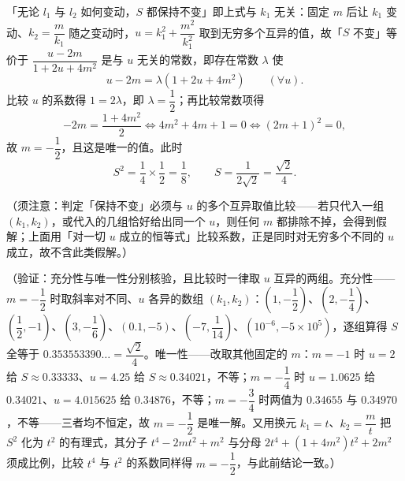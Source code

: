 \begin{answer}
「无论 \(l_{1}\) 与 \(l_{2}\) 如何变动，\(S\) 都保持不变」即上式与 \(k_{1}\) 无关：固定 \(m\) 后让 \(k_{1}\) 变动、\(k_{2}=\dfrac{m}{k_{1}}\) 随之变动时，\(u=k_{1}^{2}+\dfrac{m^{2}}{k_{1}^{2}}\) 取到无穷多个互异的值，故「\(S\) 不变」等价于 \(\dfrac{u-2m}{1+2u+4m^{2}}\) 是与 \(u\) 无关的常数，即存在常数 \(\lambda\) 使
\nopagebreak[4]
\[
u-2m=\lambda\left(1+2u+4m^{2}\right)\qquad(\forall u).
\]
比较 \(u\) 的系数得 \(1=2\lambda\)，即 \(\lambda=\dfrac{1}{2}\)；再比较常数项得
\nopagebreak[4]
\[
-2m=\frac{1+4m^{2}}{2}\iff4m^{2}+4m+1=0\iff(2m+1)^{2}=0,
\]
故 \(m=-\dfrac{1}{2}\)，且这是唯一的值。此时
\nopagebreak[4]
\[
S^{2}=\frac{1}{4}\times\frac{1}{2}=\frac{1}{8},\qquad S=\frac{1}{2\sqrt2}=\frac{\sqrt2}{4}.
\]

（须注意：判定「保持不变」必须与 \(u\) 的多个互异取值比较——若只代入一组 \((k_{1},k_{2})\)，或代入的几组恰好给出同一个 \(u\)，则任何 \(m\) 都排除不掉，会得到假解；上面用「对一切 \(u\) 成立的恒等式」比较系数，正是同时对无穷多个不同的 \(u\) 成立，故不含此类假解。）

（验证：充分性与唯一性分别核验，且比较时一律取 \(u\) 互异的两组。充分性——\(m=-\dfrac{1}{2}\) 时取斜率对不同、\(u\) 各异的数组 \((k_{1},k_{2})\)：\(\left(1,-\dfrac{1}{2}\right)\)、\(\left(2,-\dfrac{1}{4}\right)\)、\(\left(\dfrac{1}{2},-1\right)\)、\(\left(3,-\dfrac{1}{6}\right)\)、\((0.1,-5)\)、\(\left(-7,\dfrac{1}{14}\right)\)、\((10^{-6},-5\times10^{5})\)，逐组算得 \(S\) 全等于 \(0.353553390\ldots=\dfrac{\sqrt2}{4}\)。唯一性——改取其他固定的 \(m\)：\(m=-1\) 时 \(u=2\) 给 \(S\approx0.33333\)、\(u=4.25\) 给 \(S\approx0.34021\)，不等；\(m=-\dfrac{1}{4}\) 时 \(u=1.0625\) 给 \(0.34021\)、\(u=4.015625\) 给 \(0.34876\)，不等；\(m=-\dfrac{3}{4}\) 时两值为 \(0.34655\) 与 \(0.34970\)，不等——三者均不恒定，故 \(m=-\dfrac{1}{2}\) 是唯一解。又用换元 \(k_{1}=t\)、\(k_{2}=\dfrac{m}{t}\) 把 \(S^{2}\) 化为 \(t^{2}\) 的有理式，其分子 \(t^{4}-2mt^{2}+m^{2}\) 与分母 \(2t^{4}+(1+4m^{2})t^{2}+2m^{2}\) 须成比例，比较 \(t^{4}\) 与 \(t^{2}\) 的系数同样得 \(m=-\dfrac{1}{2}\)，与此前结论一致。）




\end{answer}

